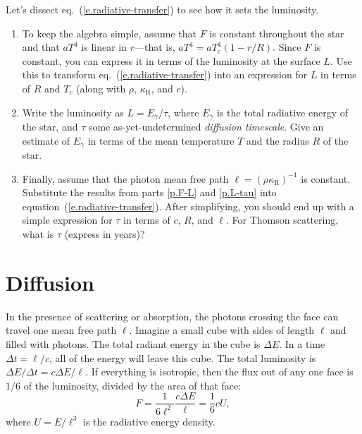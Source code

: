 \begin{exercisebox}
\label{ex.radiative-transfer-diffusion}
Let's dissect eq.~(\ref{e.radiative-transfer}) to see how it sets the luminosity.  
\begin{enumerate}
\item\label{p.F-L}
To keep the algebra simple, assume that $F$ is constant throughout the star and that $aT^{4}$ is linear in $r$---that is, $aT^{4} = aT_{c}^{4}(1-r/R)$.  Since $F$ is constant, you can express it in terms of the luminosity at the surface $L$.  Use this to transform eq.~(\ref{e.radiative-transfer}) into an expression for $L$ in terms of $R$ and $T_{c}$ (along with $\rho$, $\kappa_{\mathrm{R}}$, and $c$).

\item\label{p.L-tau}
Write the luminosity as $L = E_{\gamma}/\tau$, where $E_{\gamma}$ is the total radiative energy of the star, and $\tau$ some as-yet-undetermined \emph{diffusion timescale}.  Give an estimate of $E_{\gamma}$ in terms of the mean temperature $T$ and the radius $R$ of the star.

\item\label{p.tau}
Finally, assume that the photon mean free path $\ell = (\rho\kappa_{\mathrm{R}})^{-1}$ is constant.  Substitute the results from parts \ref{p.F-L} and \ref{p.L-tau} into equation~(\ref{e.radiative-transfer}).  After simplifying, you should end up with a simple expression for $\tau$ in terms of $c$, $R$, and $\ell$.  For Thomson scattering, what is $\tau$ (express in years)?
\end{enumerate}
\end{exercisebox}

\section{Diffusion}\label{s.diffusion}

In the presence of scattering or absorption, the photons crossing the face can travel one mean free path $\ell$. Imagine a small cube with sides of length $\ell$ and filled with photons. The total radiant energy in the cube is $\Delta E$. In a time $\Delta t = \ell/c$, all of the energy will leave this cube. The total luminosity is $\Delta E/\Delta t = c\Delta E/\ell$. If everything is isotropic, then the flux out of any one face is $1/6$ of the luminosity, divided by the area of that face:
\[
	F = \frac{1}{6\ell^{2}}\frac{c\Delta E}{\ell} = \frac{1}{6}c U,
\]
where $U = E/\ell^{3}$ is the radiative energy density. 


